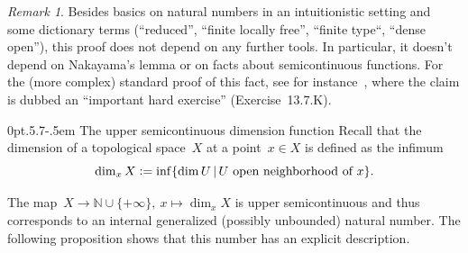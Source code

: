 \documentclass[10pt,reqno,a4paper]{amsbook}
\makeatletter
\theoremstyle{definition}
\theoremstyle{plain}
\theoremstyle{remark}
\newtheorem{rem}[defn]{Remark}
\newcommand{\NN}{\mathbb{N}}
\newcommand{\?}{\,{:}\,}
\renewcommand{\_}{\mathpunct{.}\,}
\newcommand{\defeq}{\vcentcolon=}
\def\subsection{\@startsection{subsection}{2}%
  {0pt}{.5\linespacing\@plus.7\linespacing}{-.5em}%
  {\normalfont\bfseries}}
\makeatother
\begin{document}
\begin{rem}Besides basics on natural numbers in an intuitionistic
setting and some dictionary terms (``reduced'', ``finite locally free'',
``finite type``, ``dense open''), this proof does not depend on any further
tools. In particular, it doesn't depend on Nakayama's lemma or on facts about
semicontinuous functions. For the (more complex) standard proof of this fact, see for
instance~\cite{vakil:foag}, where the claim is dubbed an ``important hard
exercise'' (Exercise~13.7.K).\end{rem}


\subsection{The upper semicontinuous dimension function} Recall that the
dimension of a topological space~$X$ at a point~$x \in X$ is defined as the
infimum
\[ \dim_x X \defeq \inf\{ \dim U \,|\, \text{$U$ open neighborhood of~$x$} \}. \]

The map~$X \to \NN \cup \{+\infty\},\ x \mapsto \dim_x X$ is upper
semicontinuous and thus corresponds to an internal generalized (possibly
unbounded) natural number. The following proposition shows that this number has
an explicit description.
\end{document}
